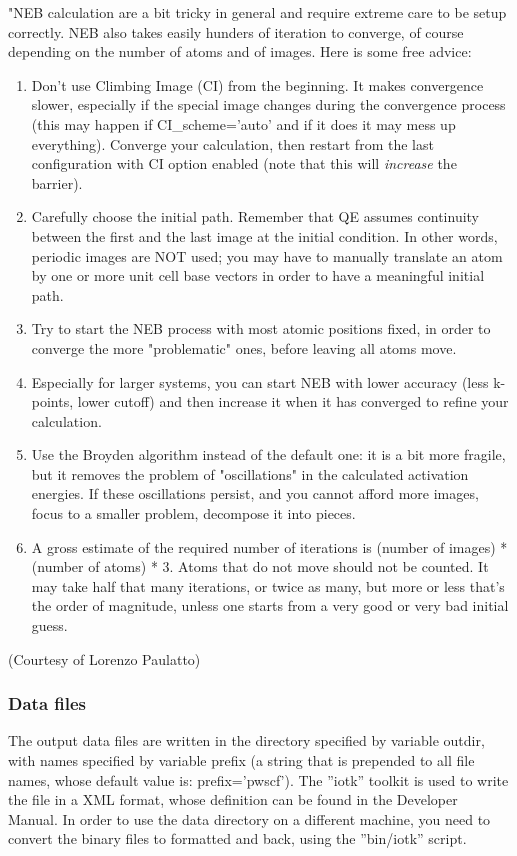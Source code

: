 \documentclass[12pt,a4paper]{article}
\begin{document}
"NEB calculation are a bit tricky in general and require extreme care to be
setup correctly. NEB also takes easily hunders of iteration to converge,
of course depending on the number of atoms and of images. Here is some
free advice:
\begin{enumerate}
\item 
Don't use Climbing Image (CI) from the beginning. It makes convergence slower, 
especially if the special image changes during the convergence process (this 
may happen if CI\_scheme='auto' and if it does it may mess up everything).
Converge your calculation, then restart from the last configuration with
CI option enabled (note that this will {\em increase} the barrier).
\item
Carefully choose the initial path. Remember that QE assumes continuity
between the first and the last image at the initial condition. In other 
words, periodic images are NOT used; you may have to manually translate
an atom by one or more unit cell base vectors in order to have a meaningful
initial path.
\item
Try to start the NEB process with most atomic positions fixed, 
in order to converge the more "problematic" ones, before leaving
all atoms move.
\item
Especially for larger systems, you can start NEB with lower accuracy 
(less k-points, lower cutoff) and then increase it when it has
converged to refine your calculation.
\item
Use the Broyden algorithm instead of the default one: it is a bit more
fragile, but it removes the problem of "oscillations" in the calculated
activation energies. If these oscillations persist, and you cannot afford 
more images, focus to a smaller problem, decompose it into pieces.
\item
A gross estimate of the required number of iterations is
(number of images) * (number of atoms) * 3. Atoms that do not
move should not be counted. It may take half that many iterations, 
or twice as many, but more or less that's the order of magnitude, 
unless one starts from a very good or very bad initial guess.
\end{enumerate}
(Courtesy of Lorenzo Paulatto)

\subsubsection{Data files}

The output data files are written in the directory specified by variable
outdir, with names specified by variable prefix (a string that is prepended
to all file names, whose default value is: prefix='pwscf'). The ''iotk''
toolkit is used to write the file in a XML format, whose definition can
be found in the Developer Manual. In order to use the data directory
on a different machine, you need to convert the binary files to formatted
and back, using the ''bin/iotk'' script.
\end{document}
